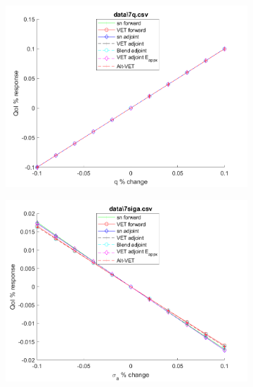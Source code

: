 \documentclass[12pt]{report}
\begin{document}
\begin{figure}[H]
\label{Trial4}
\centering
\begin{subfigure}{.5\textwidth}
  \centering
  \includegraphics[width=.98\linewidth]{figures2/7qSens.png}
  \label{T4:sfig1}
\end{subfigure}%
\begin{subfigure}{.5\textwidth}
  \centering
  \includegraphics[width=.98\linewidth]{figures2/7sigaSens.png}
  \label{T4:sfig2}
\end{subfigure}
%
\begin{subfigure}{.5\textwidth}
  \centering

\end{subfigure}
\end{figure}
\end{document}
